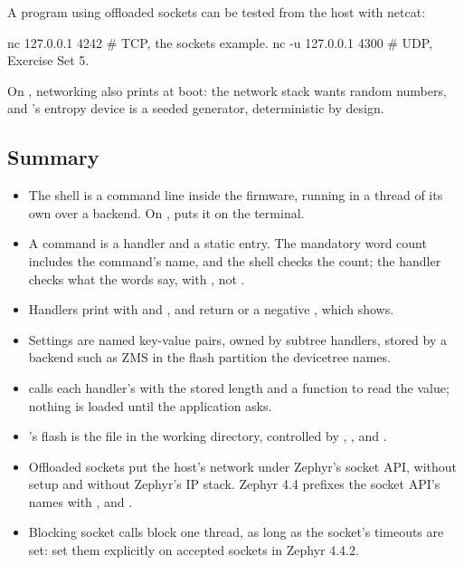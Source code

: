 A program using offloaded sockets can be tested from the host with netcat:

\begin{shell}
nc 127.0.0.1 4242       # TCP, the sockets example.
nc -u 127.0.0.1 4300    # UDP, Exercise Set 5.
\end{shell}

\noindent On , networking also prints  at boot: the network stack wants random numbers, and ’s entropy
device is a seeded generator, deterministic by design.

\subsection{Summary}
\begin{itemize}
  \item The shell is a command line inside the firmware, running in a thread of its own over a backend. On
    ,  puts it on the terminal.
  \item A command is a handler and a static entry. The mandatory word count includes the command’s name, and
    the shell checks the count; the handler checks what the words say, with , not
    .
  \item Handlers print with  and , and return  or a negative
    , which  shows.
  \item Settings are named key-value pairs, owned by subtree handlers, stored by a backend such as ZMS in
    the flash partition the devicetree names.
  \item {} calls each handler’s  with the stored length and a function to
    read the value; nothing is loaded until the application asks.
  \item {}’s flash is the file  in the working directory, controlled by
    , ,  and .
  \item Offloaded sockets put the host’s network under Zephyr’s socket API, without setup and without
    Zephyr’s IP stack. Zephyr 4.4 prefixes the socket API’s names with ,  and
    .
  \item Blocking socket calls block one thread, as long as the socket’s timeouts are set: set them
    explicitly on accepted sockets in Zephyr 4.4.2.
\end{itemize}
